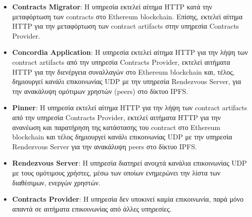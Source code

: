 \begin{itemize}
    \item \textbf{Contracts Migrator}: Η υπηρεσία εκτελεί αίτημα HTTP κατά την μεταφόρτωση των \textenglish{contracts} στο Ethereum blockchain. Eπίσης, εκτελεί αίτημα HTTP για την μεταφόρτωση των contract artifacts στην υπηρεσία Contracts Provider.

    \item \textbf{Concordia Application}: Η υπηρεσία εκτελεί αίτημα HTTP για την λήψη των contract \textenglish{artifacts} από την υπηρεσία Contracts Provider, εκτελεί αιτήματα HTTP για την διενέργεια συναλλαγών στο Ethereum blockchain και, τέλος, δημιουργεί κανάλι επικοινωνίας UDP με την υπηρεσία Rendezvous Server, για την ανακάλυψη ομότιμων χρηστών (peers) στο δίκτυο IPFS.

    \item \textbf{Pinner}: Η υπηρεσία εκτελεί αίτημα HTTP για την λήψη των contract artifacts από την υπηρεσία Contracts Provider, εκτελεί αιτήματα HTTP για την ανανέωση και παρατήρηση της κατάστασης του contract στο Ethereum blockchain και τέλος δημιουργεί κανάλι επικοινωνίας UDP με την υπηρεσία Rendezvous Server για την ανακάλυψη peers στο δίκτυο IPFS.

    \item \textbf{Rendezvous Server}: Η υπηρεσία διατηρεί ανοιχτά κανάλια επικοινωνίας UDP με τους ομότιμους χρήστες, μέσω των οποίων ενημερώνει την λίστα των διαθέσιμων, ενεργών χρηστών.

    \item \textbf{Contracts Provider}: Η υπηρεσία δεν υποκινεί καμία επικοινωνία, παρά μόνο απαντά σε αιτήματα επικοινωνίας από άλλες υπηρεσίες.
\end{itemize}
